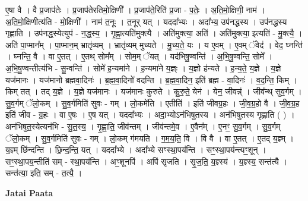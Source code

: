 \documentclass[17pt]{extarticle}
\begin{document}
ए॒षा वै । वै प्र॒जाप॑तेः । प्र॒जाप॑तेरतिमो॒क्षिणी᳚ । प्र॒जाप॑ते॒रिति॑ प्र॒जा - प॒तेः॒ । अ॒ति॒मो॒क्षिणी॒ नाम॑ । अ॒ति॒मो॒क्षिणीत्य॑ति - मो॒क्षिणी᳚ । नाम॑ त॒नूः । त॒नूर् यत् । यददा᳚भ्यः । अदा᳚भ्य॒ उप॑नद्धस्य । उप॑नद्धस्य गृह्णाति । उप॑नद्ध॒स्येत्युप॑ - न॒द्ध॒स्य॒ । गृ॒ह्णा॒त्यति॑मुक्त्यै । अति॑मुक्त्या॒ अति॑ । अति॑मुक्त्या॒ इत्यति॑ - मु॒क्त्यै॒ । अति॑ पा॒प्मान᳚म् । पा॒प्मान॒म् भ्रातृ॑व्यम् । भ्रातृ॑व्यम् मुच्यते । मु॒च्य॒ते॒ यः । य ए॒वम् । ए॒वम् ॅवेद॑ । वेद॒ घ्नन्ति॑ । घ्नन्ति॒ वै । वा ए॒तत् । ए॒तथ् सोम᳚म् । सोम॒म् ॅयत् । यद॑भिषु॒ण्वन्ति॑ । अ॒भि॒षु॒ण्वन्ति॒ सोमे᳚ । अ॒भि॒षु॒ण्वन्तीत्य॑भि - सु॒न्वन्ति॑ । सोमे॑ ह॒न्यमा॑ने । ह॒न्यमा॑ने य॒ज्ञ्ः । य॒ज्ञो ह॑न्यते । ह॒न्य॒ते॒ य॒ज्ञे । य॒ज्ञे यज॑मानः । यज॑मानो ब्रह्मवा॒दिनः॑ । ब्र॒ह्म॒वा॒दिनो॑ वदन्ति । ब्र॒ह्म॒वा॒दिन॒ इति॑ ब्रह्म - वा॒दिनः॑ । व॒द॒न्ति॒ किम् । किम् तत् । तद् य॒ज्ञे । य॒ज्ञे यज॑मानः । यज॑मानः कुरुते । कु॒रु॒ते॒ येन॑ । येन॒ जीवन्न्॑ । जीव᳚न्थ् सुव॒र्गम् । सु॒व॒र्गम् ॅलो॒कम् । सु॒व॒र्गमिति॑ सुवः - गम् । लो॒कमे॑ति । एतीति॑ । इति॑ जीवग्र॒हः । जी॒व॒ग्र॒हो वै । जी॒व॒ग्र॒ह इति॑ जीव - ग्र॒हः । वा ए॒षः । ए॒ष यत् । यददा᳚भ्यः । अदा॒भ्योऽन॑भिषुतस्य । अन॑भिषुतस्य गृह्णाति ( ) । अन॑भिषुत॒स्येत्यन॑भि - सु॒त॒स्य॒ । गृ॒ह्णा॒ति॒ जीव॑न्तम् । जीव॑न्तमे॒व । ए॒वैन᳚म् । ए॒नꣳ॒॒ सु॒व॒र्गम् । सु॒व॒र्गम् ॅलो॒कम् । सु॒व॒र्गमिति॑ सुवः - गम् । लो॒कम् ग॑मयति । ग॒म॒य॒ति॒ वि । वि वै । वा ए॒तत् । ए॒तद् य॒ज्ञ्म् । य॒ज्ञ्म् छि॑न्दन्ति । छि॒न्द॒न्ति॒ यत् । यददा᳚भ्ये । अदा᳚भ्ये सꣳस्था॒पय॑न्ति । सꣳ॒॒स्था॒पय॑न्त्यꣳ॒॒शून् । सꣳ॒॒स्था॒पय॒न्तीति॑ सम् - स्था॒पय॑न्ति । अꣳ॒॒शूनपि॑ । अपि॑ सृजति । सृ॒ज॒ति॒ य॒ज्ञ्स्य॑ । य॒ज्ञ्स्य॒ सन्त॑त्यै । सन्त॑त्या॒ इति॒ सम् - त॒त्यै॒ । \newline

\textbf{Jatai Paata} \newline
\end{document}
